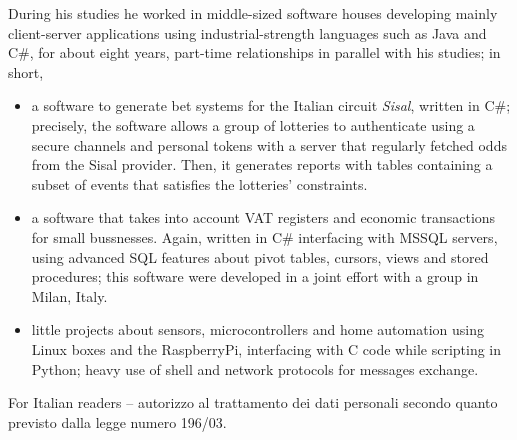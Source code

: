 \documentclass[a4paper]{tufte-handout}
\begin{document}
    During his studies he worked in middle-sized software houses
     developing mainly client-server
    applications using industrial-strength languages such as Java and C\#, for
    about eight years, part-time relationships in parallel with his studies; in short,
    \begin{itemize}
        \item a software to generate bet systems for the Italian circuit
        \textit{Sisal}, written in C\#; precisely, the software allows a group
        of lotteries to authenticate using a secure channels and personal
        tokens with a server that regularly fetched odds from the Sisal
        provider. Then, it generates reports with tables containing a
        subset of events that satisfies the lotteries' constraints.
        \item a software that takes into account VAT registers and economic
        transactions for small bussnesses. Again, written in C\# interfacing 
        with MSSQL servers, using advanced SQL features about pivot tables,
        cursors, views and stored procedures; this software were developed in
        a joint effort with a group in Milan, Italy.
        \item little projects about sensors, microcontrollers and home
        automation using Linux boxes and the RaspberryPi, interfacing with C
        code while scripting in Python; heavy use of shell and network protocols
        for messages exchange.
    \end{itemize}
        
    \vfill
    \noindent\makebox[\linewidth]{\rule{\textwidth}{0.4pt}}
    For Italian readers -- autorizzo al trattamento dei dati personali secondo
    quanto previsto dalla legge numero 196/03.
    
\end{document}
